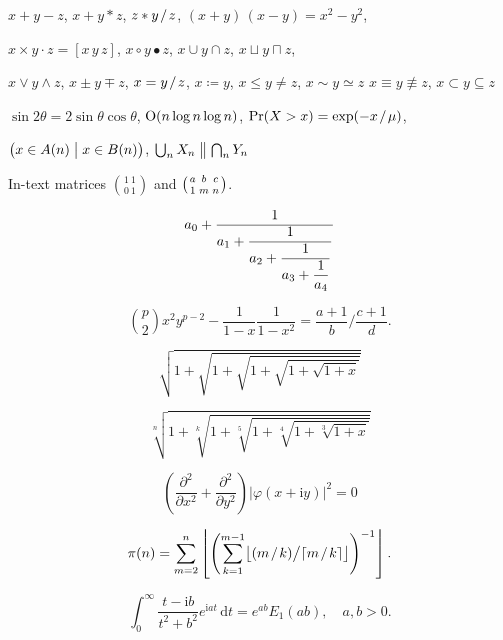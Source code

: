 \documentclass[12pt, a4paper, oneside]{article}
\newcommand{\mathup}[1]{\mathrm{#1}}
\newcommand*{\divslash}{%
	\mathbin{%
		\nonscript\mskip-2mu / \nonscript\mskip-2mu%
	}%
}  %
\theoremstyle{Plain}
\theoremstyle{Definition}
\theoremstyle{Remark}
\begin{document}
\begin{appendix}
\noindent $x + y - z$, \quad $x + y * z$, \quad $z * y \divslash z$, \quad
$(x+y)\,(x-y) = x^2 - y^2$,

\noindent $x \times y \cdot z = [x\, y\, z]$, \quad $x\circ y \bullet z$, \quad
$x\cup y \cap z$, \quad $x\sqcup y \sqcap z$, \quad

\noindent $x \vee y \wedge z$, \quad $x\pm y\mp z$, \quad
$x=y \divslash z$, \;\; $x \coloneqq y$, \;\; $x\le y \ne z$, \;\; $x \sim y \simeq z$
$x \equiv y \nequiv z$, \;\; $x\subset y \subseteq z$

\noindent $\sin2\theta=2\sin\theta\cos\theta$, \quad
$\hbox{O}(n\log n\log n)$, \quad
$\Pr(X>x)=\exp(-x \divslash \mu)$,

\noindent $\bigl(x\in A(n)\bigm|x\in B(n)\bigr)$, \quad
$\bigcup_n X_n\bigm\|\bigcap_n Y_n$


\noindent In-text matrices $\binom{1\ 1}{0\ 1}$ and $\bigl(\genfrac{}{}{0pt}{}{a}{1}\genfrac{}{}{0pt}{}{b}{m}\genfrac{}{}{0pt}{}{c}{n}\bigr)$.


$$a_0+\frac1{\displaystyle a_1 +
	{\strut \frac1{\displaystyle a_2 +
			{\strut \frac1{\displaystyle a_3 +
					{\strut \frac1{\displaystyle a_4}}}}}}}$$


$$\binom{p}{2}x^2y^{p-2} - \frac1{1 - x}\frac{1}{1 - x^2}
=
\frac{a+1}{b}\bigg/\frac{c+1}{d}.$$


$$\sqrt{1+\sqrt{1+\sqrt{1+\sqrt{1+\sqrt{1+x}}}}}$$

$$\sqrt[n]{1+\sqrt[k]{1+\sqrt[5]{1+\sqrt[4]{1+\sqrt[3]{1+x}}}}}$$


$$\left(\frac{\partial^2}{\partial x^2} + \frac{\partial^2}{\partial y^2}\right)
\bigl|\varphi(x+\mathup{i}y)\bigr|^2=0$$



$$\pi(n)=\sum_{m=2}^n\left\lfloor\Biggl(\sum_{k=1}^{m-1}\bigl
\lfloor(m \divslash k) \big/ \lceil m \divslash k\rceil\bigr\rfloor\Biggr)^{-1}\right\rfloor.$$


$$\int_0^\infty \frac{t - \mathup{i} b}{t^2 + b^2}e^{\mathup{i}at}\,\mathup{d}t=e^{ab}E_1(ab), \quad
a,b > 0.$$


\end{appendix}
\end{document}
